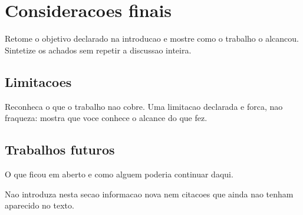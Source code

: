 \chapter{Consideracoes finais}
\label{cap:conclusao}

Retome o objetivo declarado na introducao e mostre como o trabalho o alcancou.
Sintetize os achados sem repetir a discussao inteira.

\section{Limitacoes}
\label{sec:limitacoes}

Reconheca o que o trabalho nao cobre. Uma limitacao declarada e forca, nao
fraqueza: mostra que voce conhece o alcance do que fez.

\section{Trabalhos futuros}
\label{sec:futuros}

O que ficou em aberto e como alguem poderia continuar daqui.

Nao introduza nesta secao informacao nova nem citacoes que ainda nao tenham
aparecido no texto.
